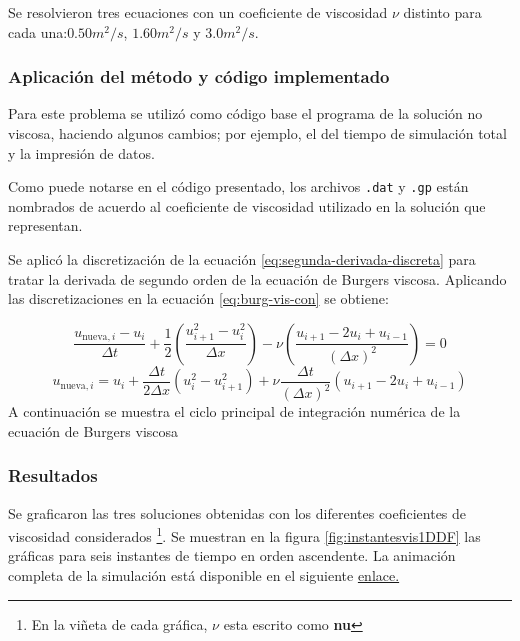 \documentclass[12pt]{article}
\begin{document}
	Se resolvieron tres ecuaciones con un coeficiente de viscosidad $\nu$ distinto para cada una:$0.50\unit{m^{2}\per s}$, $1.60\unit{m^{2}\per s}$ y $3.0\unit{m^{2}\per s}$.
	\subsubsection{Aplicación del método y código implementado}
	Para este problema se utilizó como código base el programa de la solución no viscosa, haciendo algunos cambios; por ejemplo, el del tiempo de simulación total y la impresión de datos.
	
	Como puede notarse en el código presentado, los archivos \texttt{.dat} y \texttt{.gp} están nombrados de acuerdo al coeficiente de viscosidad utilizado en la solución que representan.
	
	Se aplicó la discretización de la ecuación \ref{eq:segunda-derivada-discreta} para tratar la derivada de segundo orden de la ecuación de Burgers viscosa. Aplicando las discretizaciones en la ecuación \ref{eq:burg-vis-con} se obtiene:
	
	\begin{equation}
		\frac{u_{\text{nueva},i}-u_{i}}{\Delta t} +  \frac{1}{2} \left(\frac{u^{2}_{i+1}-u^{2}_{i}}{\Delta x}\right)  -  \nu \left( \frac{u_{i+1}-2u_{i}+u_{i-1}}{(\Delta x)^{2}} \right) =0
	\end{equation}
	\begin{equation}
		u_{\text{nueva},i} = u_{i} + \frac{\Delta t}{2 \Delta x} \left( u^{2}_{i}-u^{2}_{i+1} \right)  + \nu \frac{\Delta t}{(\Delta x)^2}\left( u_{i+1}-2u_{i}+u_{i-1} \right) 
	\end{equation}
	A continuación se muestra el ciclo principal de integración numérica de la ecuación de Burgers viscosa
	
	
	
	\subsubsection{Resultados}
	Se graficaron las tres soluciones obtenidas con los diferentes coeficientes de viscosidad considerados \footnote{En la viñeta de cada gráfica, $\nu$ esta escrito como \textbf{nu}}. Se muestran en la figura \ref{fig:instantesvis1DDF} las gráficas para seis instantes de tiempo en orden ascendente. La animación completa de la simulación está disponible en el siguiente \href{https://github.com/highchen147/practicas/blob/main/burg-vis1DDF/results/simulacion.mp4}{enlace.}
	
\end{document}

